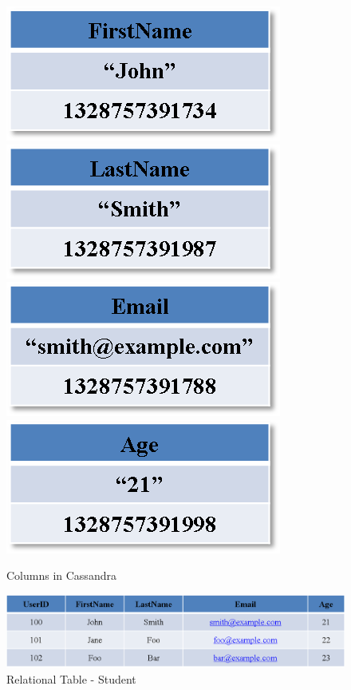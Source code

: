 \begin{description}
\begin{figure}[H]
	\newcommand{\W}{.2\textwidth}
	\centering
	\includegraphics[width=\W]{./figure/Example/Column_FirstName.png}
	\includegraphics[width=\W]{./figure/Example/Column_LastName.png}
	\includegraphics[width=\W]{./figure/Example/Column_Email.png}
	\includegraphics[width=\W]{./figure/Example/Column_Age.png}
	\caption{Columns in Cassandra}\label{f:column-FirstName}
\end{figure}

\begin{figure}[h]
	\centering
	\includegraphics[width=.8\textwidth]{./figure/Example/RelationalTable_User.png}
	\caption{Relational Table - Student}\label{f:RDB-User}
\end{figure}


\end{description}
